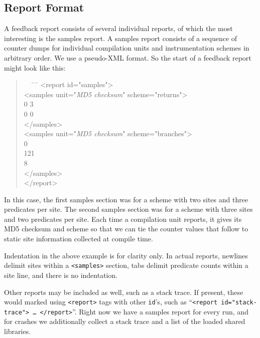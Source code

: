 \documentclass[times,10pt,twocolumn]{article}
\begin{document}
\subsection{Report Format}

A feedback report consists of several individual reports, of which the
most interesting is the samples report.  A samples report consists of
a sequence of counter dumps for individual compilation units and
instrumentation schemes in arbitrary order.  We use a pseudo-XML
format.  So the start of a feedback report might look like this:

\begin{quote}
  \begin{tt}
    \begin{small}
    \begin{tabbing}
      \ \ \=\ \ \=\kill
      <report id="samples"> \\
      \> <samples unit="\textit{MD5 checksum}" scheme="returns"> \\
      \> 0 3 \\
      \> 0 0 \\
      \> </samples> \\
      \> <samples unit="\textit{MD5 checksum}" scheme="branches"> \\
      \> 0 \\
      \> 121 \\
      \> 8 \\
      \> </samples> \\
      </report>
    \end{tabbing}
  \end{small}
\end{tt}
\end{quote}

In this case, the first samples section was for a scheme with two
sites and three predicates per site.  The second samples section was
for a scheme with three sites and two predicates per site.  Each time
a compilation unit reports, it gives its MD5 checksum and scheme so
that we can tie the counter values that follow to static site
information collected at compile time.

Indentation in the above example is for clarity only.  In actual
reports, newlines delimit sites within a \texttt{<samples>} section,
tabs delimit predicate counts within a site line, and there is no
indentation.

Other reports may be included as well, such as a stack trace.  If
present, these would marked using \texttt{<report>} tags with other
\texttt{id}'s, such as ``\texttt{<report id="stack-trace"> \dots
  </report>}''.  Right now we have a samples report for every run, and
for crashes we additionally collect a stack trace and a list of the
loaded shared libraries.
\end{document}
